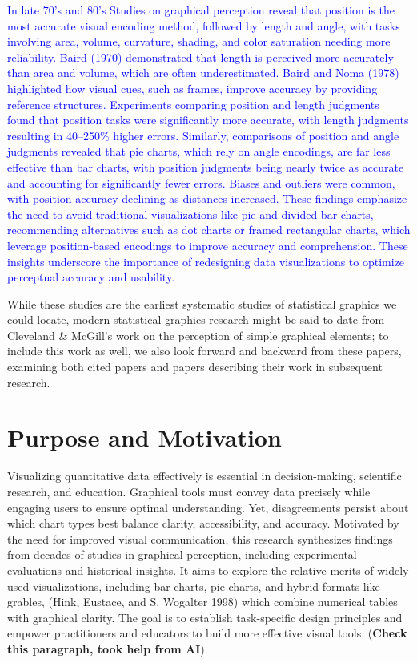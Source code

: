 \documentclass[
  10pt,
  letterpaper,
  twocolumn]{article}
\newcommand{\mt}[1]{{\textcolor{blue}{#1}}}
\newcommand{\svp}[1]{{\textcolor{RedOrange}{#1}}}
\begin{document}
\mt{In late 70's and 80's Studies on graphical perception reveal that
position is the most accurate visual encoding method, followed by length
and angle, with tasks involving area, volume, curvature, shading, and
color saturation needing more reliability. Baird (1970) demonstrated
that length is perceived more accurately than area and volume, which are
often underestimated. Baird and Noma (1978) highlighted how visual cues,
such as frames, improve accuracy by providing reference structures.
Experiments comparing position and length judgments found that position
tasks were significantly more accurate, with length judgments resulting
in 40--250\% higher errors. Similarly, comparisons of position and angle
judgments revealed that pie charts, which rely on angle encodings, are
far less effective than bar charts, with position judgments being nearly
twice as accurate and accounting for significantly fewer errors. Biases
and outliers were common, with position accuracy declining as distances
increased. These findings emphasize the need to avoid traditional
visualizations like pie and divided bar charts, recommending
alternatives such as dot charts or framed rectangular charts, which
leverage position-based encodings to improve accuracy and comprehension.
These insights underscore the importance of redesigning data
visualizations to optimize perceptual accuracy and usability.}

\svp{While these studies are the earliest systematic studies of
statistical graphics we could locate, modern statistical graphics
research might be said to date from Cleveland \& McGill's work on the
perception of simple graphical elements; to include this work as well,
we also look forward and backward from these papers, examining both
cited papers and papers describing their work in subsequent research.}

\hypertarget{purpose-and-motivation}{%
\section{Purpose and Motivation}\label{purpose-and-motivation}}

Visualizing quantitative data effectively is essential in
decision-making, scientific research, and education. Graphical tools
must convey data precisely while engaging users to ensure optimal
understanding. Yet, disagreements persist about which chart types best
balance clarity, accessibility, and accuracy. Motivated by the need for
improved visual communication, this research synthesizes findings from
decades of studies in graphical perception, including experimental
evaluations and historical insights. It aims to explore the relative
merits of widely used visualizations, including bar charts, pie charts,
and hybrid formats like grables, (Hink, Eustace, and S. Wogalter 1998)
which combine numerical tables with graphical clarity. The goal is to
establish task-specific design principles and empower practitioners and
educators to build more effective visual tools. (\textbf{Check this
paragraph, took help from AI})
\end{document}
